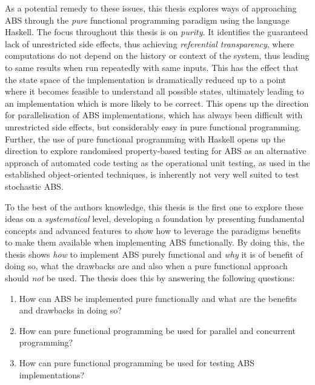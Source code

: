As a potential remedy to these issues, this thesis explores ways of approaching ABS through the \textit{pure} functional programming paradigm using the language Haskell. The focus throughout this thesis is on \textit{purity}. It identifies the guaranteed lack of unrestricted side effects, thus achieving \textit{referential transparency}, where computations do not depend on the history or context of the system, thus leading to same results when run repeatedly with same inputs. This has the effect that the state space of the implementation is dramatically reduced up to a point where it becomes feasible to understand all possible states, ultimately leading to an implementation which is more likely to be correct. This opens up the direction for parallelisation of ABS implementations, which has always been difficult with unrestricted side effects, but considerably easy in pure functional programming. Further, the use of pure functional programming with Haskell opens up the direction to explore randomised property-based testing for ABS as an alternative approach of automated code testing as the operational unit testing, as used in the established object-oriented techniques, is inherently not very well suited to test stochastic ABS.

To the best of the authors knowledge, this thesis is the first one to explore these ideas on a \textit{systematical} level, developing a foundation by presenting fundamental concepts and advanced features to show how to leverage the paradigms benefits \cite{hudak_history_2007} to make them available when implementing ABS functionally. By doing this, the thesis shows \textit{how} to implement ABS purely functional and \textit{why} it is of benefit of doing so, what the drawbacks are and also when a pure functional approach should \textit{not} be used. The thesis does this by answering the following questions:

\begin{enumerate}
	\item How can ABS be implemented pure functionally and what are the benefits and drawbacks in doing so?
	\item How can pure functional programming be used for parallel and concurrent programming? 
	\item How can pure functional programming be used for testing ABS implementations?
\end{enumerate}

\medskip

